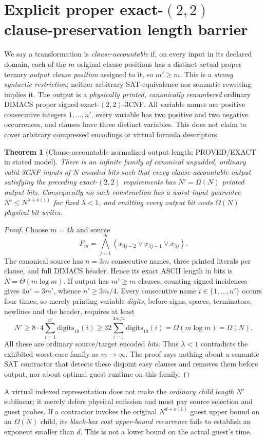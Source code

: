 \documentclass[11pt]{article}
\newtheorem{theorem}{Theorem}
\begin{document}
\section{Explicit proper exact-$(2,2)$ clause-preservation length barrier}
We say a transformation is \emph{clause-accountable} if, on every input in its declared domain, each of the $m$ original clause positions has a distinct actual proper ternary \emph{output clause position} assigned to it, so $m'\ge m$. This is a \emph{strong syntactic restriction}; neither arbitrary SAT-equivalence nor semantic rewriting implies it. The output is a \emph{physically printed, canonically renumbered} ordinary DIMACS proper signed exact-$(2,2)$-3CNF. All variable names are positive consecutive integers $1,\ldots,n'$, every variable has two positive and two negative occurrences, and clauses have three distinct variables. This does not claim to cover arbitrary compressed encodings or virtual formula descriptors.

\begin{theorem}[Clause-accountable normalized output length; PROVED/EXACT in stated model]
There is an infinite family of canonical unpadded, ordinary valid 3CNF inputs of $N$ encoded bits such that \emph{every} clause-accountable output satisfying the preceding exact-$(2,2)$ requirements has $N'=\Omega(N)$ printed output bits. Consequently no such construction has a worst-input guarantee $N'\le N^{\lambda+o(1)}$ for fixed $\lambda<1$, and emitting every output bit costs $\Omega(N)$ physical bit writes.
\end{theorem}
\begin{proof}
Choose $m=4h$ and source
\[
F_m=\bigwedge_{j=1}^{m}(x_{3j-2}\vee x_{3j-1}\vee x_{3j}).
\]
The canonical source has $n=3m$ consecutive names, three printed literals per clause, and full DIMACS header. Hence its exact ASCII length in bits is $N=\Theta(m\log m)$. If output has $m'\ge m$ clauses, counting signed incidences gives $4n'=3m'$, whence $n'\ge3m/4$. Every consecutive name $i\in\{1,\ldots,n'\}$ occurs four times, so merely printing variable \emph{digits}, before signs, spaces, terminators, newlines and the header, requires at least
\[
N'\ge 8\cdot4\sum_{i=1}^{n'}\mathrm{digits}_{10}(i)
\ge32\sum_{i=1}^{3m/4}\mathrm{digits}_{10}(i)
=\Omega(m\log m)=\Omega(N).
\]
All these are ordinary source/target encoded \emph{bits}. Thus $\lambda<1$ contradicts the exhibited worst-case family as $m\to\infty$. The proof says nothing about a semantic SAT contractor that detects these disjoint easy clauses and removes them before output, nor about optimal guest runtime on this family.
\end{proof}
A virtual indexed representation does not make the \emph{ordinary child length} $N'$ sublinear; it merely defers physical emission and must pay source selection and guest probes. If a contractor invokes the original $N^{d+o(1)}$ guest upper bound on an $\Omega(N)$ child, its \emph{black-box cost upper-bound recurrence} fails to establish an exponent smaller than $d$. This is not a lower bound on the actual guest's time.
\end{document}
